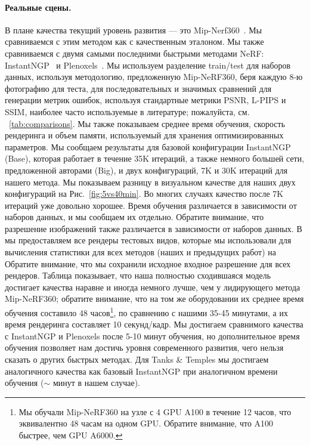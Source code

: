 \paragraph{Реальные сцены.}
В плане качества текущий уровень развития — это Mip-Nerf360~\cite{barron2021mipnerf}. Мы сравниваемся с этим методом как с качественным эталоном. Мы также сравниваемся с двумя самыми последними быстрыми методами NeRF: InstantNGP~\cite{mueller2022instant} и Plenoxels~\cite{plenoxels}.
Мы используем разделение train/test для наборов данных, используя методологию, предложенную Mip-NeRF360, беря каждую 8-ю фотографию для теста, для последовательных и значимых сравнений для генерации метрик ошибок, используя стандартные метрики PSNR, L-PIPS и SSIM, наиболее часто используемые в литературе; пожалуйста, см. ~\ref{tab:comparisons}. 
Мы также показываем среднее время обучения, скорость рендеринга и объем памяти, используемый для хранения оптимизированных параметров. Мы сообщаем результаты для базовой конфигурации InstantNGP (Base), которая работает в течение 35K итераций, а также немного большей сети, предложенной авторами (Big), и двух конфигураций, 7K и 30K итераций для нашего метода. 
Мы показываем разницу в визуальном качестве для наших двух конфигураций на Рис.~\ref{fig:5vs40min}. Во многих случаях качество после 7K итераций уже довольно хорошее.
Время обучения различается в зависимости от наборов данных, и мы сообщаем их отдельно. Обратите внимание, что разрешение изображений также различается в зависимости от наборов данных.
В  мы предоставляем все рендеры тестовых видов, которые мы использовали для вычисления статистики для всех методов (наших и предыдущих работ) на  Обратите внимание, что мы сохранили исходное входное разрешение для всех рендеров.
Таблица показывает, что наша полностью сходившаяся модель достигает качества наравне и иногда немного лучше, чем у лидирующего метода Mip-NeRF360; обратите внимание, что на том же оборудовании их среднее время обучения составило 48 часов\footnote{Мы обучали Mip-NeRF360 на узле с 4 GPU A100 в течение 12 часов, что эквивалентно 48 часам на одном GPU. Обратите внимание, что A100 быстрее, чем GPU A6000.}, по сравнению с нашими 35-45 минутами, а их время рендеринга составляет 10 секунд/кадр. Мы достигаем сравнимого качества с InstantNGP и Plenoxels после 5-10 минут обучения, но дополнительное время обучения позволяет нам достичь уровня современного развития, чего нельзя сказать о других быстрых методах. Для Tanks \& Temples мы достигаем аналогичного качества как базовый InstantNGP при аналогичном времени обучения ($\sim$ минут в нашем случае).

